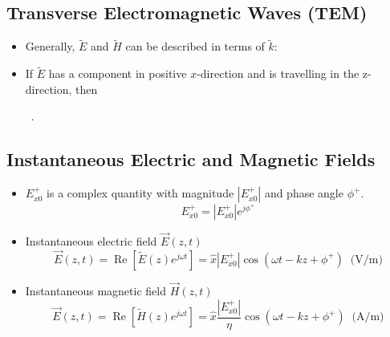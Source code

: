 \documentclass[a4paper]{article}
\begin{document}
\subsection{Transverse Electromagnetic Waves (TEM)}
\begin{itemize}
    \item Generally, $\widetilde{E}$ and $\widetilde{H}$ can be described in terms of $\widetilde{k}$:
    \begin{center}
    \end{center}
    \item If $\widetilde{E}$ has a component in positive $x$-direction and is travelling in the z-direction, then
     \begin{center}
    \ .
    \end{center}
\end{itemize}

\subsection{Instantaneous Electric and Magnetic Fields}
\begin{itemize}
    \item $E_{x0}^+$ is a complex quantity with magnitude $|E_{x0}^+|$ and phase angle $\phi^+$.
    $$E_{x0}^+ = |E_{x0}^+|e^{j\phi^+}$$
    \item Instantaneous electric field $\overrightarrow{E}(z, t)$
    $$\overrightarrow{E}(z, t) = \operatorname{Re}\left[\widetilde{E}(z)e^{j\omega t}\right] = \hat{x}|E_{x0}^+|\cos(\omega t-kz+\phi^+)\ \text{ (V/m)}$$
    \item Instantaneous magnetic field $\overrightarrow{H}(z, t)$
    $$\overrightarrow{E}(z, t) = \operatorname{Re}\left[\widetilde{H}(z)e^{j\omega t}\right] = \hat{x}\frac{|E_{x0}^+|}{\eta}\cos(\omega t-kz+\phi^+)\ \text{ (A/m)}$$
\end{itemize}
\end{document}
